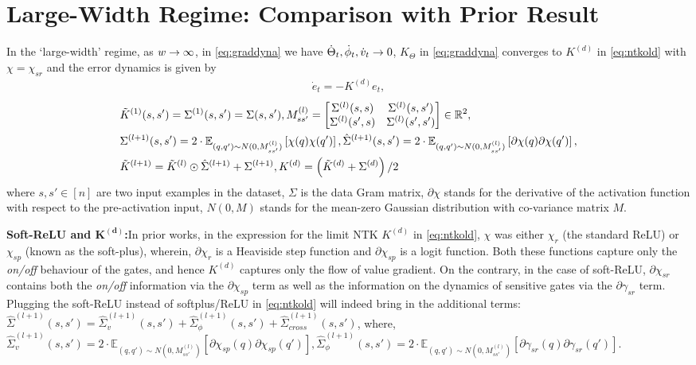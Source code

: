 \section{Large-Width Regime: Comparison with Prior Result}\label{sec:exact}
In the `large-width' regime, as $w\rightarrow\infty$, in \eqref{eq:graddyna} we have $\dot{\Theta}_t, \dot{\phi}_t, \dot{v}_t\rightarrow 0$, $K_{\Theta}$ in \eqref{eq:graddyna} converges to $K^{(d)}$ in \eqref{eq:ntkold} with $\chi=\chi_{sr}$ and the error dynamics is given by
\begin{align}
\dot{e}_t=-K^{(d)} e_t,
\end{align} 
\begin{align}\label{eq:ntkold}
&\tilde{K}^{(1)}(s,s')=\Sigma^{(1)}(s,s')=\Sigma(s,s'), M^{(l)}_{ss'}=\left[\begin{matrix}\Sigma^{(l)}(s,s) & \Sigma^{(l)}(s,s')\\ \Sigma^{(l)}(s',s) & \Sigma^{(l)}(s',s')\end{matrix}\right]\in \mathbb{R}^2,\\
&\Sigma^{(l+1)}(s,s')= 2\cdot\mathbb{E}_{(q,q')\sim N(0,M_{ss'}^{(l)})} \left[\chi(q)\chi(q')\right], \hat{\Sigma}^{(l+1)}(s,s')= 2\cdot\mathbb{E}_{(q,q')\sim N(0,M_{ss'}^{(l)})}\left[\partial\chi(q)\partial{\chi}(q')\right],\nonumber\\
&\tilde{K}^{(l+1)}=\tilde{K}^{(l)}\odot \hat{\Sigma}^{(l+1)}+\Sigma^{(l+1)}, K^{(d)}=\left(\tilde{K}^{(d)}+\Sigma^{(d)}\right)/2
\end{align}
where $s,s'\in[n]$ are two input examples in the dataset, $\Sigma$ is the data Gram matrix, $\partial{\chi}$ stands for the derivative of the activation function with respect to the pre-activation input, $N(0,M)$ stands for the mean-zero Gaussian distribution with co-variance matrix $M$. 

\textbf{Soft-ReLU and $\mathbf{K^{(d)}}$:}In prior works, in the expression for the limit NTK $K^{(d)}$ in \eqref{eq:ntkold}, $\chi$ was either $\chi_r$ (the standard ReLU) or $\chi_{sp}$ (known as the soft-plus), wherein, $\partial{\chi}_r$ is a Heaviside step function and $\partial{\chi}_{sp}$ is a logit function. Both these functions capture only the \emph{on/off} behaviour of the gates, and hence $K^{(d)}$ captures only the flow of value gradient. On the contrary, in the case of soft-ReLU, $\partial{\chi}_{sr}$ contains both the \emph{on/off} information via the $\partial{\chi}_{sp}$ term as well as the information on the dynamics of sensitive gates via the $\partial{\gamma}_{sr}$ term. Plugging the soft-ReLU instead of softplus/ReLU in \eqref{eq:ntkold} will indeed bring in the additional terms:
$\hat{\Sigma}^{(l+1)}(s,s')=\hat{\Sigma}^{(l+1)}_v(s,s')+ \hat{\Sigma}^{(l+1)}_{\phi}(s,s') + \hat{\Sigma}^{(l+1)}_{cross}(s,s')$, {where}, 
$\hat{\Sigma}^{(l+1)}_v(s,s')=2\cdot\mathbb{E}_{(q,q')\sim N(0,M_{ss'}^{(l)})}\left[\partial{\chi}_{sp}(q)\partial{\chi}_{sp}(q')\right],\hat{\Sigma}^{(l+1)}_{\phi}(s,s')=2\cdot\mathbb{E}_{(q,q')\sim N(0,M_{ss'}^{(l)})}\left[\partial{\gamma}_{sr}(q)\partial{\gamma}_{sr}(q')\right]$.

